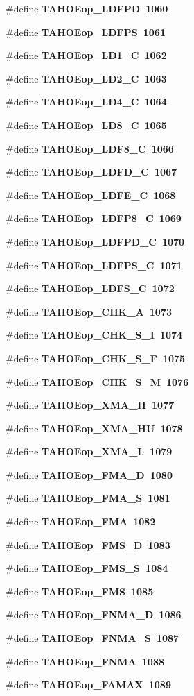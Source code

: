 \begin{CompactItemize}
\item 
\#define \bf{TAHOEop\_\-LDFPD}~1060
\item 
\#define \bf{TAHOEop\_\-LDFPS}~1061
\item 
\#define \bf{TAHOEop\_\-LD1\_\-C}~1062
\item 
\#define \bf{TAHOEop\_\-LD2\_\-C}~1063
\item 
\#define \bf{TAHOEop\_\-LD4\_\-C}~1064
\item 
\#define \bf{TAHOEop\_\-LD8\_\-C}~1065
\item 
\#define \bf{TAHOEop\_\-LDF8\_\-C}~1066
\item 
\#define \bf{TAHOEop\_\-LDFD\_\-C}~1067
\item 
\#define \bf{TAHOEop\_\-LDFE\_\-C}~1068
\item 
\#define \bf{TAHOEop\_\-LDFP8\_\-C}~1069
\item 
\#define \bf{TAHOEop\_\-LDFPD\_\-C}~1070
\item 
\#define \bf{TAHOEop\_\-LDFPS\_\-C}~1071
\item 
\#define \bf{TAHOEop\_\-LDFS\_\-C}~1072
\item 
\#define \bf{TAHOEop\_\-CHK\_\-A}~1073
\item 
\#define \bf{TAHOEop\_\-CHK\_\-S\_\-I}~1074
\item 
\#define \bf{TAHOEop\_\-CHK\_\-S\_\-F}~1075
\item 
\#define \bf{TAHOEop\_\-CHK\_\-S\_\-M}~1076
\item 
\#define \bf{TAHOEop\_\-XMA\_\-H}~1077
\item 
\#define \bf{TAHOEop\_\-XMA\_\-HU}~1078
\item 
\#define \bf{TAHOEop\_\-XMA\_\-L}~1079
\item 
\#define \bf{TAHOEop\_\-FMA\_\-D}~1080
\item 
\#define \bf{TAHOEop\_\-FMA\_\-S}~1081
\item 
\#define \bf{TAHOEop\_\-FMA}~1082
\item 
\#define \bf{TAHOEop\_\-FMS\_\-D}~1083
\item 
\#define \bf{TAHOEop\_\-FMS\_\-S}~1084
\item 
\#define \bf{TAHOEop\_\-FMS}~1085
\item 
\#define \bf{TAHOEop\_\-FNMA\_\-D}~1086
\item 
\#define \bf{TAHOEop\_\-FNMA\_\-S}~1087
\item 
\#define \bf{TAHOEop\_\-FNMA}~1088
\item 
\#define \bf{TAHOEop\_\-FAMAX}~1089
\item 

\end{CompactItemize}
